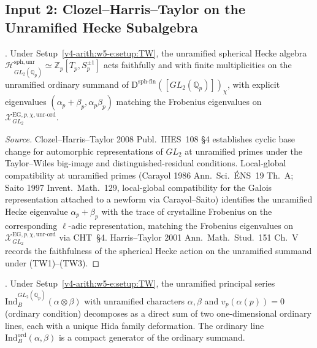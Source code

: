 \subsection{Input 2: Clozel--Harris--Taylor on the Unramified
Hecke Subalgebra}

\begin{lemma}
\label{v4-arith:w5-e:lem:CHT-unr-Hecke}
\ClaimStatusProvedElsewhere. Under
Setup~\ref{v4-arith:w5-e:setup:TW}, the unramified spherical Hecke
algebra
\(\mathcal{H}^{\mathrm{sph,unr}}_{GL_{2}(\mathbb{Q}_{p})}\simeq\mathbb{Z}_{p}[T_{p},S_{p}^{\pm 1}]\)
acts faithfully and with finite multiplicities on the unramified
ordinary summand of
\(\mathrm{D}^{\mathrm{sph\text{-}fin}}([GL_{2}(\mathbb{Q}_{p})])_{\chi}\),
with explicit eigenvalues
\((\alpha_{p}+\beta_{p},\alpha_{p}\beta_{p})\) matching the
Frobenius eigenvalues on
\(\mathcal{X}^{\mathrm{EG},p,\chi,\mathrm{unr\text{-}ord}}_{GL_{2}}\).
\end{lemma}

\begin{proof}[Source]
Clozel--Harris--Taylor 2008 Publ.~IHES~108 \S 4 establishes cyclic
base change for automorphic representations of \(GL_{2}\) at
unramified primes under the Taylor--Wiles big-image and
distinguished-residual conditions. Local-global compatibility at
unramified primes (Carayol 1986 Ann.~Sci.~\'ENS~19 Th.~A;
Saito 1997 Invent.~Math.~129, local-global compatibility
for the Galois representation attached to a newform via
Carayol--Saito) identifies the unramified Hecke eigenvalue
\(\alpha_{p}+\beta_{p}\) with the trace of crystalline Frobenius
on the corresponding \(\ell\)-adic representation, matching the
Frobenius eigenvalues on
\(\mathcal{X}^{\mathrm{EG},p,\chi,\mathrm{unr\text{-}ord}}_{GL_{2}}\)
via CHT~\S 4. Harris--Taylor 2001
Ann.~Math.~Stud.~151 Ch.~V records the faithfulness of the
spherical Hecke action on the unramified summand under (TW1)--(TW3).
\end{proof}

\begin{lemma}
\label{v4-arith:w5-e:lem:Hida-ord}
\ClaimStatusProvedElsewhere. Under
Setup~\ref{v4-arith:w5-e:setup:TW}, the unramified principal series
\(\mathrm{Ind}_{B}^{GL_{2}(\mathbb{Q}_{p})}(\alpha\otimes\beta)\) with
unramified characters \(\alpha,\beta\) and \(v_{p}(\alpha(p))=0\)
(ordinary condition) decomposes as a direct sum of two
one-dimensional ordinary lines, each with a unique Hida family
deformation. The ordinary line
\(\mathrm{Ind}^{\mathrm{ord}}_{B}(\alpha,\beta)\) is a compact generator
of the ordinary summand.
\end{lemma}

